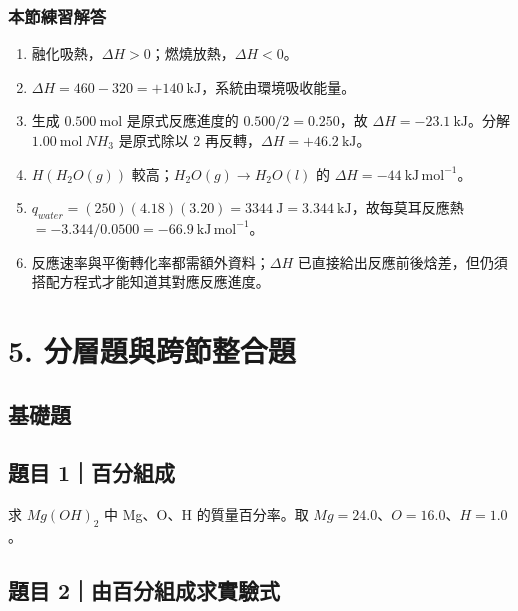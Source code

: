 \documentclass[11pt,a4paper]{article}
\providecommand{\tightlist}{%
  \setlength{\itemsep}{0pt}\setlength{\parskip}{0pt}}
\begin{document}
\subsubsection{本節練習解答}\label{ux672cux7bc0ux7df4ux7fd2ux89e3ux7b54-3}

\begin{enumerate}
\def\labelenumi{\arabic{enumi}.}
\tightlist
\item
  融化吸熱，\(\Delta H>0\)；燃燒放熱，\(\Delta H<0\)。
\item
  \(\Delta H=460-320=+140\ \mathrm{kJ}\)，系統由環境吸收能量。
\item
  生成 \(0.500\ \mathrm{mol}\) 是原式反應進度的 \(0.500/2=0.250\)，故 \(\Delta H=-23.1\ \mathrm{kJ}\)。分解 \(1.00\ \mathrm{mol}\ NH_3\) 是原式除以 2 再反轉，\(\Delta H=+46.2\ \mathrm{kJ}\)。
\item
  \(H(H_2O(g))\) 較高；\(H_2O(g)\rightarrow H_2O(l)\) 的 \(\Delta H=-44\ \mathrm{kJ\,mol^{-1}}\)。
\item
  \(q_{water}=(250)(4.18)(3.20)=3344\ \mathrm J=3.344\ \mathrm{kJ}\)，故每莫耳反應熱 \(=-3.344/0.0500=-66.9\ \mathrm{kJ\,mol^{-1}}\)。
\item
  反應速率與平衡轉化率都需額外資料；\(\Delta H\) 已直接給出反應前後焓差，但仍須搭配方程式才能知道其對應反應進度。
\end{enumerate}

\section{5. 分層題與跨節整合題}\label{ux5206ux5c64ux984cux8207ux8de8ux7bc0ux6574ux5408ux984c}

\subsection{基礎題}\label{ux57faux790eux984c}

\subsection{題目 1｜百分組成}\label{ux984cux76ee-1ux767eux5206ux7d44ux6210}

求 \(Mg(OH)_2\) 中 Mg、O、H 的質量百分率。取 \(Mg=24.0\)、\(O=16.0\)、\(H=1.0\)。

\subsection{題目 2｜由百分組成求實驗式}\label{ux984cux76ee-2ux7531ux767eux5206ux7d44ux6210ux6c42ux5be6ux9a57ux5f0f}
\end{document}
